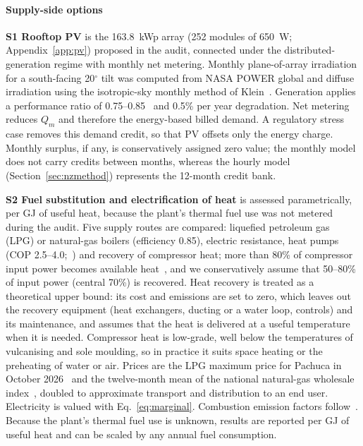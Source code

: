 \documentclass[processes,article,submit,pdftex,moreauthors]{Definitions/mdpi}
\begin{document}
\paragraph{Supply-side options}
\textbf{S1 Rooftop PV} is the 163.8~kWp array (252 modules of 650~W; Appendix~\ref{app:pv}) proposed in the audit, connected under the distributed-generation regime with monthly net metering. Monthly plane-of-array irradiation for a south-facing 20$^\circ$ tilt was computed from NASA POWER global and diffuse irradiation using the isotropic-sky monthly method of Klein~\cite{klein1977}. Generation applies a performance ratio of 0.75--0.85~\cite{reich2012} and 0.5\% per year degradation. Net metering reduces $Q_m$ and therefore the energy-based billed demand. A regulatory stress case removes this demand credit, so that PV offsets only the energy charge. Monthly surplus, if any, is conservatively assigned zero value; the monthly model does not carry credits between months, whereas the hourly model (Section~\ref{sec:nzmethod}) represents the 12-month credit bank.

\textbf{S2 Fuel substitution and electrification of heat} is assessed parametrically, per GJ of useful heat, because the plant's thermal fuel use was not metered during the audit. Five supply routes are compared: liquefied petroleum gas (LPG) or natural-gas boilers (efficiency 0.85), electric resistance, heat pumps (COP 2.5--4.0;~\cite{arpagaus2018,schlosser2020}) and recovery of compressor heat; more than 80\% of compressor input power becomes available heat~\cite{doe2016compressed}, and we conservatively assume that 50--80\% of input power (central 70\%) is recovered. Heat recovery is treated as a theoretical upper bound: its cost and emissions are set to zero, which leaves out the recovery equipment (heat exchangers, ducting or a water loop, controls) and its maintenance, and assumes that the heat is delivered at a useful temperature when it is needed. Compressor heat is low-grade, well below the temperatures of vulcanising and sole moulding, so in practice it suits space heating or the preheating of water or air. Prices are the LPG maximum price for Pachuca in October 2026~\cite{profeco2026lpg} and the twelve-month mean of the national natural-gas wholesale index~\cite{cne2026ipgn}, doubled to approximate transport and distribution to an end user. Electricity is valued with Eq.~\eqref{eq:marginal}. Combustion emission factors follow~\cite{ipcc2006}. Because the plant's thermal fuel use is unknown, results are reported per GJ of useful heat and can be scaled by any annual fuel consumption.
\end{document}
